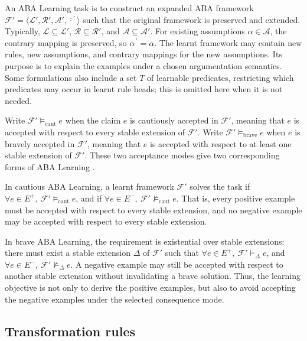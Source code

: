 An ABA Learning task is to construct an expanded ABA framework \(\mathcal{F}' = \langle \mathcal{L}', \mathcal{R}', \mathcal{A}', \overline{\cdot}^{\,\prime} \rangle\) such that the original framework is preserved and extended. Typically, \(\mathcal{L} \subseteq \mathcal{L}'\), \(\mathcal{R} \subseteq \mathcal{R}'\), and \(\mathcal{A} \subseteq \mathcal{A}'\). For existing assumptions \(\alpha \in \mathcal{A}\), the contrary mapping is preserved, so \(\overline{\alpha}^{\,\prime}=\overline{\alpha}\). The learnt framework may contain new rules, new assumptions, and contrary mappings for the new assumptions. Its purpose is to explain the examples under a chosen argumentation semantics. Some formulations also include a set \(T\) of learnable predicates, restricting which predicates may occur in learnt rule heads; this is omitted here when it is not needed.

Write \(\mathcal{F}' \models_{\mathrm{caut}} e\) when the claim \(e\) is cautiously accepted in \(\mathcal{F}'\), meaning that \(e\) is accepted with respect to every stable extension of \(\mathcal{F}'\). Write \(\mathcal{F}' \models_{\mathrm{brave}} e\) when \(e\) is bravely accepted in \(\mathcal{F}'\), meaning that \(e\) is accepted with respect to at least one stable extension of \(\mathcal{F}'\). These two acceptance modes give two corresponding forms of ABA Learning \cite{de2023aba,de2024learning}.

In cautious ABA Learning, a learnt framework \(\mathcal{F}'\) solves the task if \(\forall e \in E^+,\ \mathcal{F}' \models_{\mathrm{caut}} e\), and if \(\forall e \in E^-,\ \mathcal{F}' \not\models_{\mathrm{caut}} e\). That is, every positive example must be accepted with respect to every stable extension, and no negative example may be accepted with respect to every stable extension.

In brave ABA Learning, the requirement is existential over stable extensions: there must exist a stable extension \(\Delta\) of \(\mathcal{F}'\) such that \(\forall e \in E^+,\ \mathcal{F}' \models_{\Delta} e\), and \(\forall e \in E^-,\ \mathcal{F}' \not\models_{\Delta} e\). A negative example may still be accepted with respect to another stable extension without invalidating a brave solution. Thus, the learning objective is not only to derive the positive examples, but also to avoid accepting the negative examples under the selected consequence mode.

\subsection{Transformation rules}

